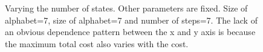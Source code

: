 \begin{figure}[H]

  \caption{Varying the number of states. Other parameters are fixed. Size of alphabet=7, size of alphabet=7 and number of steps=7. The lack of an obvious dependence pattern between the x and y axis is because the maximum total cost also varies with the cost.}\label{fig:cost}
\end{figure}
